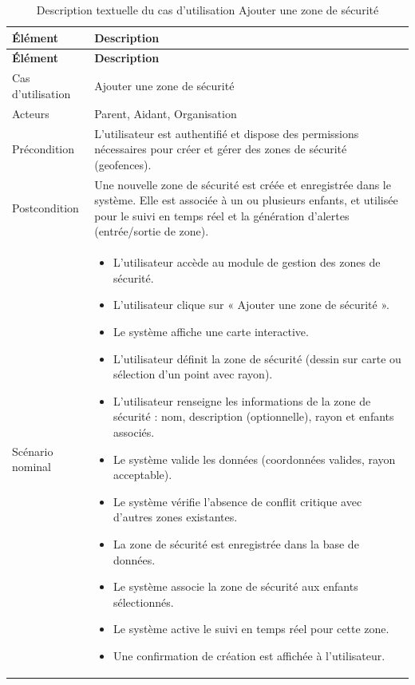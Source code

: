 \small
\renewcommand{\arraystretch}{1.1}
\setlength{\parskip}{0pt}
\begin{longtable}{|p{}|>{\raggedright\arraybackslash}p{}|}
\caption{Description textuelle du cas d'utilisation Ajouter une zone de sécurité} \\ \hline
\textbf{Élément} & \textbf{Description} \\ \hline
\endfirsthead

\hline
\textbf{Élément} & \textbf{Description} \\ \hline
\endhead

\hline
\endlastfoot

Cas d'utilisation & Ajouter une zone de sécurité \\ \hline

Acteurs & Parent, Aidant, Organisation \\ \hline

Précondition & L'utilisateur est authentifié et dispose des permissions nécessaires pour créer et gérer des zones de sécurité (geofences). \\ \hline

Postcondition & Une nouvelle zone de sécurité est créée et enregistrée dans le système. Elle est associée à un ou plusieurs enfants, et utilisée pour le suivi en temps réel et la génération d'alertes (entrée/sortie de zone). \\ \hline

Scénario nominal &
\begin{itemize}[nosep, leftmargin=*]
\item L'utilisateur accède au module de gestion des zones de sécurité.
\item L'utilisateur clique sur « Ajouter une zone de sécurité ».
\item Le système affiche une carte interactive.
\item L'utilisateur définit la zone de sécurité (dessin sur carte ou sélection d'un point avec rayon).
\item L'utilisateur renseigne les informations de la zone de sécurité : nom, description (optionnelle), rayon et enfants associés.
\item Le système valide les données (coordonnées valides, rayon acceptable).
\item Le système vérifie l'absence de conflit critique avec d'autres zones existantes.
\item La zone de sécurité est enregistrée dans la base de données.
\item Le système associe la zone de sécurité aux enfants sélectionnés.
\item Le système active le suivi en temps réel pour cette zone.
\item Une confirmation de création est affichée à l'utilisateur.
\end{itemize}
\\ \hline


\end{longtable}

